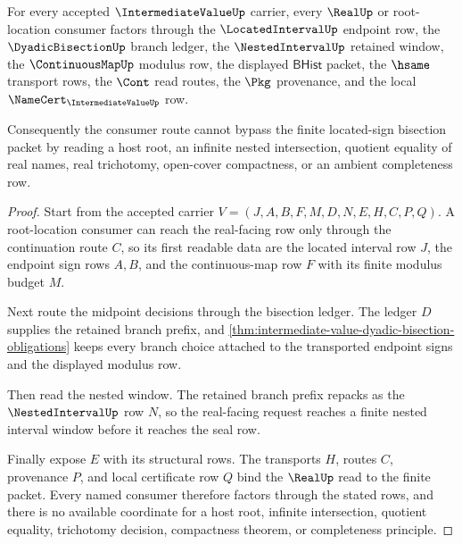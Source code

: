 \begin{theorem}
\label{thm:intermediate-value-real-seal-handoff}
For every accepted $\IntermediateValueUp$ carrier, every $\RealUp$ or root-location consumer factors through the $\LocatedIntervalUp$ endpoint row, the $\DyadicBisectionUp$ branch ledger, the $\NestedIntervalUp$ retained window, the $\ContinuousMapUp$ modulus row, the displayed $\mathsf{BHist}$ packet, the $\hsame$ transport rows, the $\Cont$ read routes, the $\Pkg$ provenance, and the local $\NameCert_{\IntermediateValueUp}$ row.

Consequently the consumer route cannot bypass the finite located-sign bisection packet by reading a host root, an infinite nested intersection, quotient equality of real names, real trichotomy, open-cover compactness, or an ambient completeness row.
\end{theorem}
\begin{proof}
Start from the accepted carrier $V=(J,A,B,F,M,D,N,E,H,C,P,Q)$. A root-location consumer can reach the real-facing row only through the continuation route $C$, so its first readable data are the located interval row $J$, the endpoint sign rows $A,B$, and the continuous-map row $F$ with its finite modulus budget $M$.

Next route the midpoint decisions through the bisection ledger. The ledger $D$ supplies the retained branch prefix, and \autoref{thm:intermediate-value-dyadic-bisection-obligations} keeps every branch choice attached to the transported endpoint signs and the displayed modulus row.

Then read the nested window. The retained branch prefix repacks as the $\NestedIntervalUp$ row $N$, so the real-facing request reaches a finite nested interval window before it reaches the seal row.

Finally expose $E$ with its structural rows. The transports $H$, routes $C$, provenance $P$, and local certificate row $Q$ bind the $\RealUp$ read to the finite packet. Every named consumer therefore factors through the stated rows, and there is no available coordinate for a host root, infinite intersection, quotient equality, trichotomy decision, compactness theorem, or completeness principle.
\end{proof}

